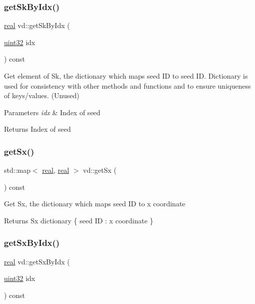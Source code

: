 \subsubsection{\texorpdfstring{get\+Sk\+By\+Idx()}{getSkByIdx()}}
{\footnotesize\ttfamily \mbox{\hyperlink{typedefs_8cpp_a58a0c7cf2501f4492da833421be92547}{real}} vd\+::get\+Sk\+By\+Idx (\begin{DoxyParamCaption}\item[{\mbox{\hyperlink{typedefs_8cpp_a8ad23e2333787a214e20a58a284a5a60}{uint32}}}]{idx }\end{DoxyParamCaption}) const}

Get element of Sk, the dictionary which maps seed ID to seed ID. Dictionary is used for consistency with other methods and functions and to ensure uniqueness of keys/values. (Unused) 
\begin{DoxyParams}{Parameters}
{\em idx} & Index of seed \\
\hline
\end{DoxyParams}
\begin{DoxyReturn}{Returns}
Index of seed 
\end{DoxyReturn}
\mbox{\label{classvd_a340f3f92b9ae32ff0f3eb2ce6cf12bd6}} 
\subsubsection{\texorpdfstring{get\+Sx()}{getSx()}}
{\footnotesize\ttfamily std\+::map$<$ \mbox{\hyperlink{typedefs_8cpp_a58a0c7cf2501f4492da833421be92547}{real}}, \mbox{\hyperlink{typedefs_8cpp_a58a0c7cf2501f4492da833421be92547}{real}} $>$ vd\+::get\+Sx (\begin{DoxyParamCaption}{ }\end{DoxyParamCaption}) const}

Get Sx, the dictionary which maps seed ID to x coordinate \begin{DoxyReturn}{Returns}
Sx dictionary \{ seed ID \+: x coordinate \} 
\end{DoxyReturn}
\mbox{\label{classvd_a960d4b8fbedb7cbb0686ad42e19d6396}} 
\subsubsection{\texorpdfstring{get\+Sx\+By\+Idx()}{getSxByIdx()}}
{\footnotesize\ttfamily \mbox{\hyperlink{typedefs_8cpp_a58a0c7cf2501f4492da833421be92547}{real}} vd\+::get\+Sx\+By\+Idx (\begin{DoxyParamCaption}\item[{\mbox{\hyperlink{typedefs_8cpp_a8ad23e2333787a214e20a58a284a5a60}{uint32}}}]{idx }\end{DoxyParamCaption}) const}

